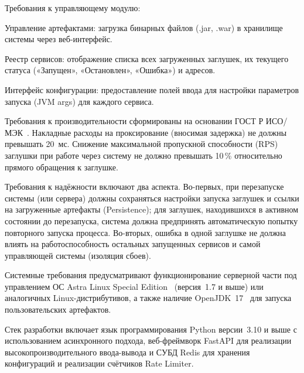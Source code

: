 Требования к управляющему модулю:

\begin{compactlist}
\item Управление артефактами: загрузка бинарных файлов (.jar, .war) в хранилище системы через веб-интерфейс.
\item Реестр сервисов: отображение списка всех загруженных заглушек, их текущего статуса («Запущен», «Остановлен», «Ошибка») и адресов.
\item Интерфейс конфигурации: предоставление полей ввода для настройки параметров запуска (JVM args) для каждого сервиса.
\end{compactlist}


Требования к производительности сформированы на основании ГОСТ Р ИСО/МЭК~\cite{gost-25010-2015}. Накладные расходы на проксирование (вносимая задержка) не должны превышать 20~мс. Снижение максимальной пропускной способности (RPS) заглушки при работе через систему не должно превышать 10\,\% относительно прямого обращения к заглушке.

Требования к надёжности включают два аспекта. Во-первых, при перезапуске системы (или сервера) должны сохраняться настройки запуска заглушек и ссылки на загруженные артефакты (Persistence); для заглушек, находившихся в активном состоянии до перезапуска, система должна предпринять автоматическую попытку повторного запуска процесса. Во-вторых, ошибка в одной заглушке не должна влиять на работоспособность остальных запущенных сервисов и самой управляющей системы (изоляция сбоев).


Системные требования предусматривают функционирование серверной части под управлением ОС Astra Linux Special Edition~\cite{matveev-astra} (версия~1.7 и выше) или аналогичных Linux-дистрибутивов, а также наличие OpenJDK~17~\cite{openjdk} для запуска пользовательских артефактов.

Стек разработки включает язык программирования Python версии~3.10 и выше с использованием асинхронного подхода, веб-фреймворк FastAPI для реализации высокопроизводительного ввода-вывода и СУБД Redis для хранения конфигураций и реализации счётчиков Rate Limiter.

